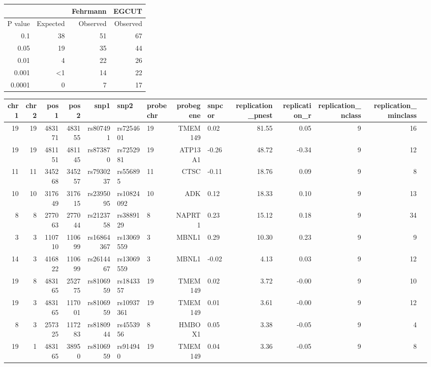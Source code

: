 \documentclass[paper=a4, fontsize=11pt]{scrartcl}	%
\numberwithin{equation}{section}									%
\numberwithin{figure}{section}										%
\numberwithin{table}{section}										%
\begin{document}
\begin{table}[ht]
	\centering
	\begin{tabular}{rrrr}
	\hline
	& & Fehrmann & EGCUT \\
	\hline
	P value & Expected & Observed & Observed \\
	\hline	  
	0.1 & 38 & 51 & 67 \\
	0.05 & 19 & 35 & 44 \\
	0.01 & 4 & 22 & 26 \\
	0.001 & <1 & 14 & 22 \\
	0.0001 & ~0 & 7 & 17 \\
	\hline
	\end{tabular}
\end{table}


\begin{table}[ht]
\centering
\begin{tabular}{rrrrrllrlrrrrr}
  \hline
chr1 & chr2 & pos1 & pos2 & snp1 & snp2 & probechr & probegene & snpcor & replication\_pnest & replication\_r & replication\_nclass & replication\_minclass \\ 
  \hline
19 &  19 & 483171 & 483155 & rs807491 & rs7254601 &  19 & TMEM149 & 0.02 & 81.55 & 0.05 &   9 &  16 \\ 
19 &  19 & 481151 & 481145 & rs873870 & rs7252981 &  19 & ATP13A1 & -0.26 & 48.72 & -0.34 &   9 &  12 \\ 
11 &  11 & 345268 & 345257 & rs7930237 & rs556895 &  11 & CTSC & -0.11 & 18.76 & 0.09 &   9 &   8 \\ 
10 &  10 & 317649 & 317615 & rs2395095 & rs10824092 &  10 & ADK & 0.12 & 18.33 & 0.10 &   9 &  13 \\ 
8 &   8 & 277063 & 277044 & rs2123758 & rs3889129 &   8 & NAPRT1 & 0.23 & 15.12 & 0.18 &   9 &  34 \\ 
3 &   3 & 110710 & 110699 & rs16864367 & rs13069559 &   3 & MBNL1 & 0.29 & 10.30 & 0.23 &   9 &   9 \\ 
14 &   3 & 416822 & 110699 & rs2614467 & rs13069559 &   3 & MBNL1 & -0.02 & 4.13 & 0.03 &   9 &  12 \\ 
19 &   8 & 483165 & 252775 & rs8106959 & rs1843357 &  19 & TMEM149 & 0.02 & 3.72 & -0.00 &   9 &  10 \\ 
19 &   3 & 483165 & 117001 & rs8106959 & rs10937361 &  19 & TMEM149 & 0.01 & 3.61 & -0.00 &   9 &  12 \\ 
8 &   3 & 257325 & 117283 & rs8180944 & rs4553956 &   8 & HMBOX1 & 0.05 & 3.38 & -0.05 &   9 &   4 \\ 
19 &   1 & 483165 & 38950 & rs8106959 & rs914940 &  19 & TMEM149 & 0.04 & 3.36 & -0.05 &   9 &   8 \\ 

\end{tabular}
\end{table}
\end{document}
